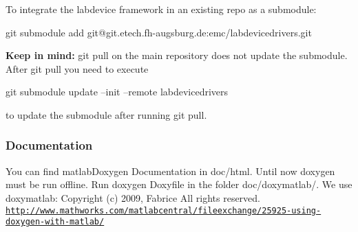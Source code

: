 To integrate the labdevice framework in an existing repo as a submodule\+: 
\begin{DoxyCode}
git submodule add git@git.etech.fh-augsburg.de:emc/labdevicedrivers.git 
\end{DoxyCode}
 {\bfseries Keep in mind\+:} git pull on the main repository does not update the submodule. After git pull you need to execute 
\begin{DoxyCode}
git submodule update --init --remote labdevicedrivers
\end{DoxyCode}
 to update the submodule after running git pull.

\subsubsection*{Documentation}

You can find matlab\+Doxygen Documentation in doc/html. Until now doxygen must be run offline. Run {\ttfamily  doxygen Doxyfile  in the folder doc/doxymatlab/. We use doxymatlab\+: Copyright (c) 2009, Fabrice All rights reserved. \href{http://www.mathworks.com/matlabcentral/fileexchange/25925-using-doxygen-with-matlab/}{\tt http\+://www.\+mathworks.\+com/matlabcentral/fileexchange/25925-\/using-\/doxygen-\/with-\/matlab/}  }